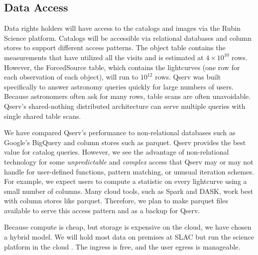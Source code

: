 \documentclass[11pt,twoside]{article}
\begin{document}
\begin{centering}
\end{centering}


\subsection{Data Access} \label{sec:dataaccess}

Data rights holders will have access to the catalogs and images via the Rubin Science platform.
Catalogs will be accessible via relational databases and column stores to support different access patterns.
The object table contains the measurements that have utilized all the visits and is estimated at $4 \times 10^{10}$ rows.
However, the ForcedSource table, which contains the lightcurves (one row for each observation of each object), will run to $10^{12}$ rows.
Qserv \citep{C15_adassxxxii} was built specifically to answer astronomy queries quickly for large numbers of users.
Because astronomers often ask for many rows, table scans are often unavoidable.
Qserv's shared-nothing distributed architecture can serve multiple queries with single shared table scans.

We have compared Qserv's performance to non-relational databases such as Google's BigQuery \citet[e.g.,][]{Document-31100} and column stores such as parquet.
Qserv provides the best value for catalog queries.
However, we see the advantage of non-relational technology for
some \emph{unpredictable} and \emph{complex} access that Qserv may or may not handle for user-defined functions, pattern matching, or unusual iteration schemes.
For example, we expect users to compute a statistic on every lightcurve using a small number of columns.
Many cloud tools, such as Spark and DASK, work best with column stores like parquet.
Therefore, we plan to make parquet files available to serve this access pattern and as a backup for Qserv.


Because compute is cheap, but storage is expensive on the cloud, we have chosen a hybrid model.
We will hold most data on premises at SLAC but run the science platform in the cloud \citep{2021arXiv211115030O}.
The ingress is free, and the user egress is manageable.
\end{document}
